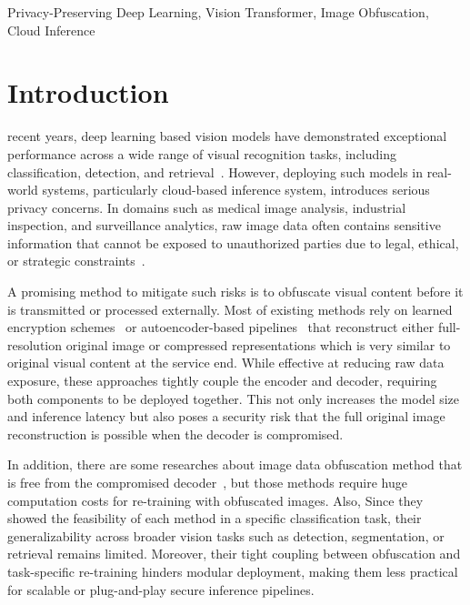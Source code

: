 \documentclass{ieeeaccess}
\newcommand{\rev}[1]{{\color{green}#1}}
\begin{document}
\begin{keywords}
\rev{Privacy-Preserving Deep Learning, Vision Transformer, Image Obfuscation, Cloud Inference}
\end{keywords}

\titlepgskip=-21pt

\maketitle

\section{Introduction} \label{sec:intro}

 recent years, deep learning based vision models have demonstrated exceptional performance across a wide range of visual recognition tasks, including classification, detection, and retrieval~\cite{VoulodimosDeep2018, CHAI2021100134, Alsajri_Hacimahmud_2023, TSIRTSAKIS2025298}. However, deploying such models in real-world systems, particularly cloud-based inference system, introduces serious privacy concerns. In domains such as medical image analysis, industrial inspection, and surveillance analytics, raw image data often contains sensitive information that cannot be exposed to unauthorized parties due to legal, ethical, or strategic constraints~\cite{Grünberg2017,info:doi/10.2196/22269, Padmapriya2024, 01630814-202314060-00005, app132312727}.

A promising method to mitigate such risks is to obfuscate visual content before it is transmitted or processed externally. Most of existing methods rely on learned encryption schemes~\cite{TANWAR2022103503,10.1145/3570165,Madani_2025} or autoencoder-based pipelines~\cite{s23010519,Zhou2024,SHIRI2024104583,10781629} that reconstruct either full-resolution original image or compressed representations which is very similar to original visual content at the service end. While effective at reducing raw data exposure, these approaches tightly couple the encoder and decoder, requiring both components to be deployed together. This not only increases the model size and inference latency but also poses a security risk that the full original image reconstruction is possible when the decoder is compromised.

In addition, there are some researches about image data obfuscation method that is free from the compromised decoder~\cite{9129656,10.1007/978-3-031-37586-6_18,s24103166}, but those methods require huge computation costs for re-training with obfuscated images. Also, Since they showed the feasibility of each method in a specific classification task, their generalizability across broader vision tasks such as detection, segmentation, or retrieval remains limited. Moreover, their tight coupling between obfuscation and task-specific re-training hinders modular deployment, making them less practical for scalable or plug-and-play secure inference pipelines.
\end{document}

